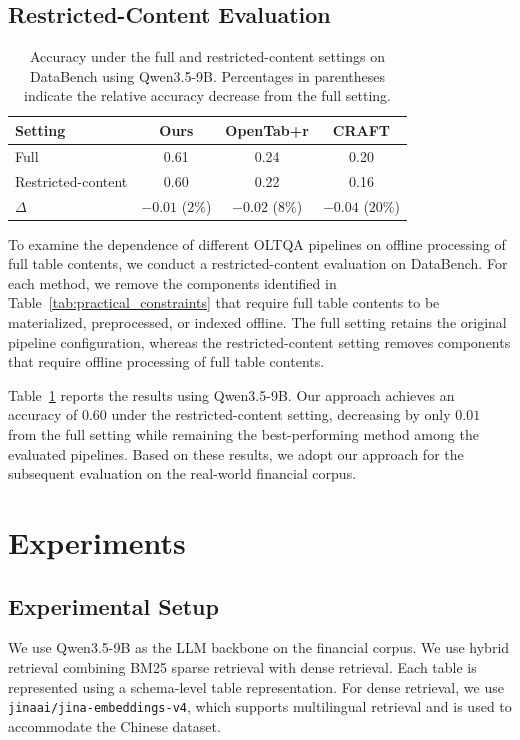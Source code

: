 \subsection{Restricted-Content Evaluation}
\begin{table}[t]
\centering
\small
\begin{tabular}{lccc}
\hline
\textbf{Setting} & \textbf{Ours} & \textbf{OpenTab+r} & \textbf{CRAFT} \\
\hline
Full               & 0.61 & 0.24 & 0.20 \\
Restricted-content & 0.60 & 0.22 & 0.16 \\
\hline
$\Delta$            & $-0.01$ ($2\%$) & $-0.02$ ($8\%$) & $-0.04$ ($20\%$) \\
\hline
\end{tabular}
\caption{Accuracy under the full and restricted-content settings on DataBench using Qwen3.5-9B. Percentages in parentheses indicate the relative accuracy decrease from the full setting.}
\label{tab:restricted_content}
\end{table}
To examine the dependence of different OLTQA pipelines on offline processing of full table contents, we conduct a restricted-content evaluation on DataBench.
For each method, we remove the components identified in Table~\ref{tab:practical_constraints} that require full table contents to be materialized, preprocessed, or indexed offline.
The full setting retains the original pipeline configuration, whereas the restricted-content setting removes components that require offline processing of full table contents.

Table~\ref{tab:restricted_content} reports the results using Qwen3.5-9B.
Our approach achieves an accuracy of $0.60$ under the restricted-content setting, decreasing by only $0.01$ from the full setting while remaining the best-performing method among the evaluated pipelines.
Based on these results, we adopt our approach for the subsequent evaluation on the real-world financial corpus.

\section{Experiments}
\subsection{Experimental Setup}
We use Qwen3.5-9B as the LLM backbone on the financial corpus.
We use hybrid retrieval combining BM25 sparse retrieval with dense retrieval.
Each table is represented using a schema-level table representation.
For dense retrieval, we use \texttt{jinaai/jina-embeddings-v4}, which supports multilingual retrieval and is used to accommodate the Chinese dataset.

